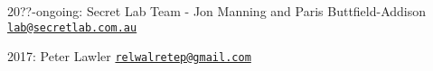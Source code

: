 
\begin{DoxyItemize}
\item 20??-\/ongoing\-: Secret Lab Team -\/ Jon Manning and Paris Buttfield-\/\-Addison \href{mailto:lab@secretlab.com.au}{\tt lab@secretlab.\-com.\-au}
\item 2017\-: Peter Lawler \href{mailto:relwalretep@gmail.com}{\tt relwalretep@gmail.\-com} 
\end{DoxyItemize}